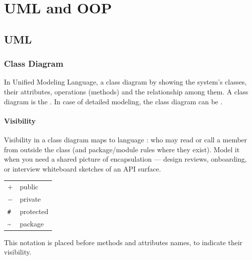 \chapter{UML and OOP}
\label{chap:c++newfeatures}

\section{UML}
    \subsection{Class Diagram}
    In Unified Modeling Language, a class diagram  by showing the system's classes, 
    their attributes, operations (methods) and the relationship among 
    them.
    \newline
    A class diagram is the .
    \newline
    In case of detailed modeling, 
    the class diagram can be .
    \subsubsection{Visibility}
    Visibility in a class diagram maps to language :
    who may read or call a member from outside the class (and package/module rules where they exist).
    Model it when you need a shared picture of encapsulation --- design reviews, onboarding, or interview whiteboard sketches of an API surface.
    \vspace{-0.5cm}
    \begin{table}[ht]
        \begin{tabular}{l l}
            $+$ \quad \quad & public\\
            $-$ & private\\
            \texttt{\#} & protected\\
            \textasciitilde & package\\
        \end{tabular}
    \end{table}
    This notation is placed before methods and attributes names, 
    to indicate their visibility. 
    
